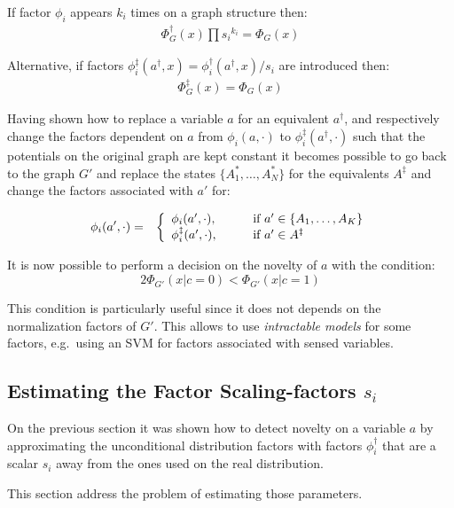 If factor $\phi_i$ appears $k_i$ times on a graph structure then:
\begin{eqnarray}
\Phi^\dag_G(x) \prod {s_i}^{k_i} = \Phi_G(x)
\end{eqnarray}

Alternative, if factors $\phi^\ddag_i(a^\dag,x) = \phi^\dag_i(a^\dag,x)/s_i$ are
introduced then:
\begin{eqnarray}
\Phi^\ddag_G(x) = \Phi_G(x)
\end{eqnarray}

Having shown how to replace a variable $a$ for an equivalent $a^\dag$, and
respectively change the factors dependent on $a$ from $\phi_i(a,\cdot)$ to
$\phi^\ddag_i(a^\dag,\cdot)$ such that the potentials on the original
graph are kept constant it becomes possible to go back to the graph $G'$ and
replace the states $\{A^*_1,\dotsc,A^*_N\}$ for the equivalents $A^\ddag$
and change the factors associated with $a'$ for:

\begin{eqnarray*}
\phi_i(a', \cdot) &=& \left\{
  \begin{array}{l l}
    \phi_i(a',\cdot), & \qquad \text{if } a' \in \{A_1,\dotsc,A_K\} \\
    \phi^\ddag_i(a', \cdot), & \qquad \text{if } a' \in A^\ddag
  \end{array} \right. \\
\end{eqnarray*}

It is now possible to perform a decision on the novelty of $a$ with the condition:
\begin{equation}
2 \Phi_{G'}(x | c = 0) < \Phi_{G'}(x | c= 1)
\end{equation}

This condition is particularly useful since it does not depends on the normalization
factors of $G'$. This allows to use \emph{intractable models} for some factors,
e.g.\ using an \gls{SVM} for factors associated with sensed variables. 


\subsection{Estimating the Factor Scaling-factors $s_i$}
On the previous section it was shown how to detect novelty on a variable $a$ by
approximating the unconditional distribution factors with factors $\phi^\dag_i$
that are a scalar $s_i$ away from the ones used on the real distribution.

This section address the problem of estimating those parameters.





